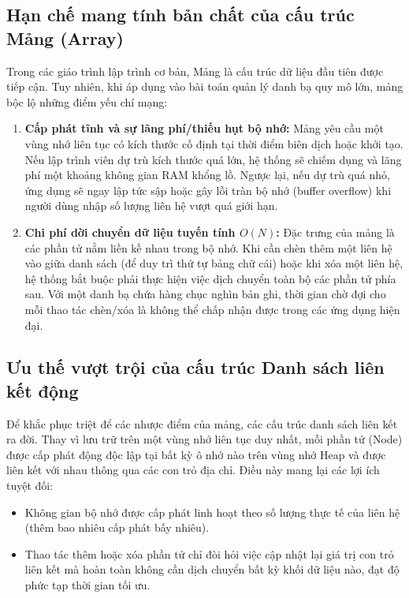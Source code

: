 \subsection{Hạn chế mang tính bản chất của cấu trúc Mảng (Array)}
Trong các giáo trình lập trình cơ bản, Mảng là cấu trúc dữ liệu đầu tiên được tiếp cận. Tuy nhiên, khi áp dụng vào bài toán quản lý danh bạ quy mô lớn, mảng bộc lộ những điểm yếu chí mạng:
\begin{enumerate}
    \item \textbf{Cấp phát tĩnh và sự lãng phí/thiếu hụt bộ nhớ:} Mảng yêu cầu một vùng nhớ liên tục có kích thước cố định tại thời điểm biên dịch hoặc khởi tạo. Nếu lập trình viên dự trù kích thước quá lớn, hệ thống sẽ chiếm dụng và lãng phí một khoảng không gian RAM khổng lồ. Ngược lại, nếu dự trù quá nhỏ, ứng dụng sẽ ngay lập tức sập hoặc gây lỗi tràn bộ nhớ (buffer overflow) khi người dùng nhập số lượng liên hệ vượt quá giới hạn.
    \item \textbf{Chi phí dời chuyển dữ liệu tuyến tính $O(N)$:} Đặc trưng của mảng là các phần tử nằm liền kề nhau trong bộ nhớ. Khi cần chèn thêm một liên hệ vào giữa danh sách (để duy trì thứ tự bảng chữ cái) hoặc khi xóa một liên hệ, hệ thống bắt buộc phải thực hiện việc dịch chuyển toàn bộ các phần tử phía sau. Với một danh bạ chứa hàng chục nghìn bản ghi, thời gian chờ đợi cho mỗi thao tác chèn/xóa là không thể chấp nhận được trong các ứng dụng hiện đại.
\end{enumerate}

\subsection{Ưu thế vượt trội của cấu trúc Danh sách liên kết động}
Để khắc phục triệt để các nhược điểm của mảng, các cấu trúc danh sách liên kết ra đời. Thay vì lưu trữ trên một vùng nhớ liên tục duy nhất, mỗi phần tử (Node) được cấp phát động độc lập tại bất kỳ ô nhớ nào trên vùng nhớ Heap và được liên kết với nhau thông qua các con trỏ địa chỉ. Điều này mang lại các lợi ích tuyệt đối:
\begin{itemize}
    \item Không gian bộ nhớ được cấp phát linh hoạt theo số lượng thực tế của liên hệ (thêm bao nhiêu cấp phát bấy nhiêu).
    \item Thao tác thêm hoặc xóa phần tử chỉ đòi hỏi việc cập nhật lại giá trị con trỏ liên kết mà hoàn toàn không cần dịch chuyển bất kỳ khối dữ liệu nào, đạt độ phức tạp thời gian tối ưu.
\end{itemize}

